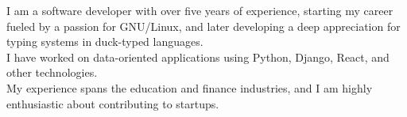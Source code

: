 \vspace{0.2cm}


\begin{minipage}[t]{1\textwidth}
    \vspace{-\baselineskip}
    I am a software developer with over five years of experience, starting my career fueled by a passion for GNU/Linux, and later developing a deep appreciation for typing systems in duck-typed languages. \\
    I have worked on data-oriented applications using Python, Django, React, and other technologies. \\
    My experience spans the education and finance industries, and I am highly enthusiastic about contributing to startups.
\end{minipage}
